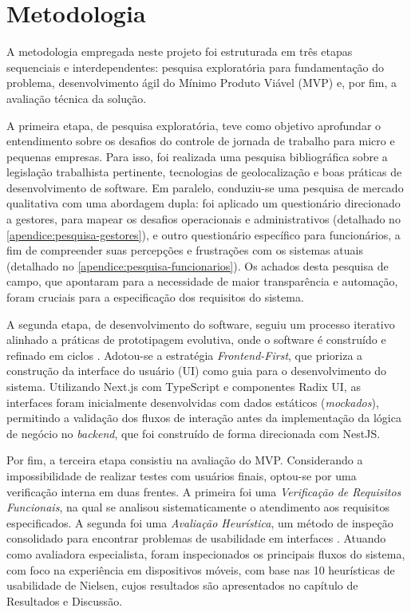 \section{Metodologia}
A metodologia empregada neste projeto foi estruturada em três etapas sequenciais e interdependentes: pesquisa exploratória para fundamentação do problema, desenvolvimento ágil do Mínimo Produto Viável (MVP) e, por fim, a avaliação técnica da solução.

A primeira etapa, de pesquisa exploratória, teve como objetivo aprofundar o entendimento sobre os desafios do controle de jornada de trabalho para micro e pequenas empresas. Para isso, foi realizada uma pesquisa bibliográfica sobre a legislação trabalhista pertinente, tecnologias de geolocalização e boas práticas de desenvolvimento de software. Em paralelo, conduziu-se uma pesquisa de mercado qualitativa com uma abordagem dupla: foi aplicado um questionário direcionado a gestores, para mapear os desafios operacionais e administrativos (detalhado no \autoref{apendice:pesquisa-gestores}), e outro questionário específico para funcionários, a fim de compreender suas percepções e frustrações com os sistemas atuais (detalhado no \autoref{apendice:pesquisa-funcionarios}). Os achados desta pesquisa de campo, que apontaram para a necessidade de maior transparência e automação, foram cruciais para a especificação dos requisitos do sistema.

A segunda etapa, de desenvolvimento do software, seguiu um processo iterativo alinhado a práticas de prototipagem evolutiva, onde o software é construído e refinado em ciclos \cite{sommerville2011software}. Adotou-se a estratégia \textit{Frontend-First}, que prioriza a construção da interface do usuário (UI) como guia para o desenvolvimento do sistema. Utilizando Next.js com TypeScript e componentes Radix UI, as interfaces foram inicialmente desenvolvidas com dados estáticos (\textit{mockados}), permitindo a validação dos fluxos de interação antes da implementação da lógica de negócio no \textit{backend}, que foi construído de forma direcionada com NestJS.

Por fim, a terceira etapa consistiu na avaliação do MVP. Considerando a impossibilidade de realizar testes com usuários finais, optou-se por uma verificação interna em duas frentes. A primeira foi uma \textit{Verificação de Requisitos Funcionais}, na qual se analisou sistematicamente o atendimento aos requisitos especificados. A segunda foi uma \textit{Avaliação Heurística}, um método de inspeção consolidado para encontrar problemas de usabilidade em interfaces \cite{Nielsen1994}. Atuando como avaliadora especialista, foram inspecionados os principais fluxos do sistema, com foco na experiência em dispositivos móveis, com base nas 10 heurísticas de usabilidade de Nielsen, cujos resultados são apresentados no capítulo de Resultados e Discussão.